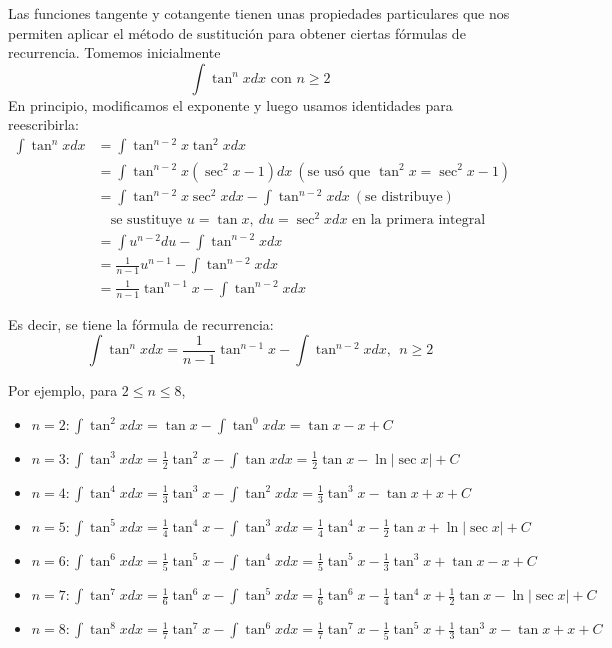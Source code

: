 Las funciones tangente y cotangente tienen unas propiedades particulares que nos permiten aplicar el método de sustitución para obtener ciertas fórmulas de recurrencia. Tomemos inicialmente
\[
\int \tan ^{n}xdx\text{ con $n\geq 2$}
\]
En principio, modificamos el exponente y luego usamos identidades para reescribirla:
{\small
\begin{align*}
\int \tan ^{n}xdx&=\int \tan ^{n-2}x\tan ^{2}xdx\\
&=\int \tan ^{n-2}x\left( \sec ^{2}x-1\right) dx \ (\text{se usó que }\tan ^{2}x=\sec ^{2}x-1)\\
&=\int \tan ^{n-2}x\sec ^{2}xdx-\int \tan ^{n-2}xdx\ (\text{se distribuye})\\
&\quad \text{se sustituye } u=\tan x,\ du=\sec ^{2}xdx \text{ en la primera integral}\\
&=\int u^{n-2}du-\int \tan ^{n-2}xdx\\
&=\frac{1}{n-1}u^{n-1}-\int \tan^{n-2}xdx\\
&=\frac{1}{n-1}\tan ^{n-1}x-\int \tan ^{n-2}xdx
\end{align*}
}

Es decir, se tiene la fórmula de recurrencia:
\begin{equation*}
\int \tan ^{n}xdx=\frac{1}{n-1}\tan ^{n-1}x-\int \tan ^{n-2}xdx,\ \ n\geq 2
\end{equation*}

Por ejemplo, para $2\leq n\leq 8$,

\begin{itemize}[leftmargin=1.2em, itemindent=0pt,       labelwidth=,labelsep=0.5em,]

\item $n=2:\int \tan ^{2}xdx=\tan x-\int \tan ^{0}xdx=\tan x-x +C$

\item $n=3:\int \tan ^{3}xdx=\frac{1}{2}\tan ^{2}x-\int \tan xdx=\frac{1}{2}\tan
x-\ln \left\vert \sec x\right\vert +C$

\item $n=4:\int \tan ^{4}xdx=\frac{1}{3}\tan ^{3}x-\int \tan ^{2}xdx=\frac{1}{3}%
\tan ^{3}x-\tan x+x+C$

\item $n=5:\int \tan ^{5}xdx=\frac{1}{4}\tan ^{4}x-\int \tan ^{3}xdx=\frac{1}{4}%
\tan ^{4}x-\frac{1}{2}\tan x+\ln \left\vert \sec x\right\vert +C$

\item $n=6:\int \tan ^{6}xdx=\frac{1}{5}\tan ^{5}x-\int \tan ^{4}xdx=\frac{1}{5}%
\tan ^{5}x-\frac{1}{3}\tan ^{3}x+\tan x-x+C$

\item $n=7:\int \tan ^{7}xdx=\frac{1}{6}\tan ^{6}x-\int \tan ^{5}xdx=\frac{1}{6}%
\tan ^{6}x-\frac{1}{4}\tan ^{4}x+\frac{1}{2}\tan x-\ln \left\vert \sec
x\right\vert +C$

\item $n=8:\int \tan ^{8}xdx=\frac{1}{7}\tan ^{7}x-\int \tan ^{6}xdx=\frac{1}{7}%
\tan ^{7}x-\frac{1}{5}\tan ^{5}x+\frac{1}{3}\tan ^{3}x-\tan x+x+C$

\end{itemize}



